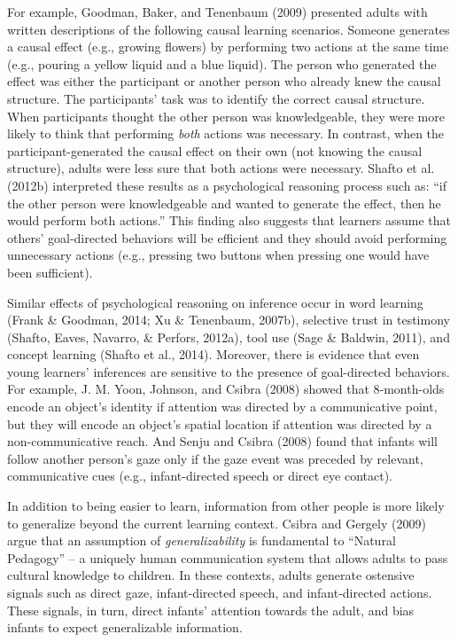 \documentclass[english,floatsintext,man]{apa6}
\theoremstyle{definition}
\theoremstyle{definition}
\theoremstyle{definition}
\theoremstyle{remark}
\begin{document}
For example, Goodman, Baker, and Tenenbaum (2009) presented adults with
written descriptions of the following causal learning scenarios. Someone
generates a causal effect (e.g., growing flowers) by performing two
actions at the same time (e.g., pouring a yellow liquid and a blue
liquid). The person who generated the effect was either the participant
or another person who already knew the causal structure. The
participants' task was to identify the correct causal structure. When
participants thought the other person was knowledgeable, they were more
likely to think that performing \emph{both} actions was necessary. In
contrast, when the participant-generated the causal effect on their own
(not knowing the causal structure), adults were less sure that both
actions were necessary. Shafto et al. (2012b) interpreted these results
as a psychological reasoning process such as: \enquote{if the other
person were knowledgeable and wanted to generate the effect, then he
would perform both actions.} This finding also suggests that learners
assume that others' goal-directed behaviors will be efficient and they
should avoid performing unnecessary actions (e.g., pressing two buttons
when pressing one would have been sufficient).

Similar effects of psychological reasoning on inference occur in word
learning (Frank \& Goodman, 2014; Xu \& Tenenbaum, 2007b), selective
trust in testimony (Shafto, Eaves, Navarro, \& Perfors, 2012a), tool use
(Sage \& Baldwin, 2011), and concept learning (Shafto et al., 2014).
Moreover, there is evidence that even young learners' inferences are
sensitive to the presence of goal-directed behaviors. For example, J. M.
Yoon, Johnson, and Csibra (2008) showed that 8-month-olds encode an
object's identity if attention was directed by a communicative point,
but they will encode an object's spatial location if attention was
directed by a non-communicative reach. And Senju and Csibra (2008) found
that infants will follow another person's gaze only if the gaze event
was preceded by relevant, communicative cues (e.g., infant-directed
speech or direct eye contact).

In addition to being easier to learn, information from other people is
more likely to generalize beyond the current learning context. Csibra
and Gergely (2009) argue that an assumption of \emph{generalizability}
is fundamental to \enquote{Natural Pedagogy} -- a uniquely human
communication system that allows adults to pass cultural knowledge to
children. In these contexts, adults generate ostensive signals such as
direct gaze, infant-directed speech, and infant-directed actions. These
signals, in turn, direct infants' attention towards the adult, and bias
infants to expect generalizable information.
\end{document}
